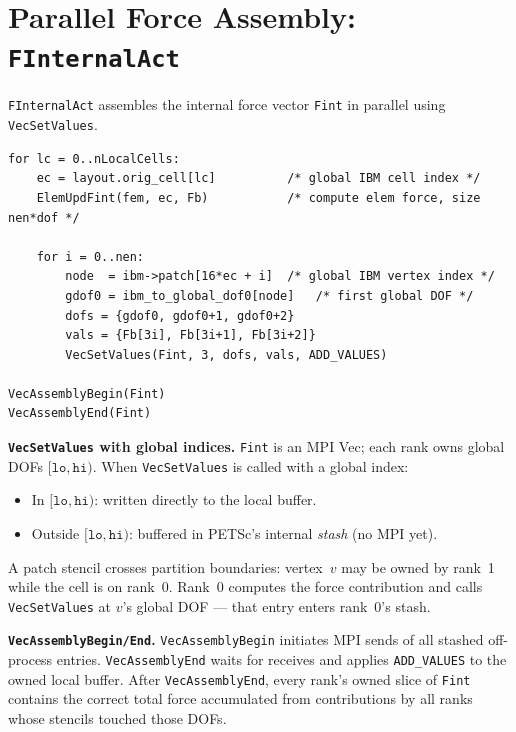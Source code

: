 \documentclass[11pt]{article}
\begin{document}
\section{Parallel Force Assembly: \texttt{FInternalAct}}

\texttt{FInternalAct} assembles the internal force vector \texttt{Fint} in parallel
using \texttt{VecSetValues}.

\begin{lstlisting}
for lc = 0..nLocalCells:
    ec = layout.orig_cell[lc]          /* global IBM cell index */
    ElemUpdFint(fem, ec, Fb)           /* compute elem force, size nen*dof */

    for i = 0..nen:
        node  = ibm->patch[16*ec + i]  /* global IBM vertex index */
        gdof0 = ibm_to_global_dof0[node]   /* first global DOF */
        dofs = {gdof0, gdof0+1, gdof0+2}
        vals = {Fb[3i], Fb[3i+1], Fb[3i+2]}
        VecSetValues(Fint, 3, dofs, vals, ADD_VALUES)

VecAssemblyBegin(Fint)
VecAssemblyEnd(Fint)
\end{lstlisting}

\textbf{\texttt{VecSetValues} with global indices.}
\texttt{Fint} is an MPI Vec; each rank owns global DOFs $[\texttt{lo}, \texttt{hi})$.
When \texttt{VecSetValues} is called with a global index:
\begin{itemize}
  \item In $[\texttt{lo}, \texttt{hi})$: written directly to the local buffer.
  \item Outside $[\texttt{lo}, \texttt{hi})$: buffered in PETSc's internal
        \emph{stash} (no MPI yet).
\end{itemize}

A patch stencil crosses partition boundaries: vertex~$v$ may be owned by rank~1
while the cell is on rank~0.  Rank~0 computes the force contribution and calls
\texttt{VecSetValues} at $v$'s global DOF --- that entry enters rank~0's stash.

\textbf{\texttt{VecAssemblyBegin/End}.}
\texttt{VecAssemblyBegin} initiates MPI sends of all stashed off-process entries.
\texttt{VecAssemblyEnd} waits for receives and applies \texttt{ADD\_VALUES} to the
owned local buffer.  After \texttt{VecAssemblyEnd}, every rank's owned slice of
\texttt{Fint} contains the correct total force accumulated from contributions
by all ranks whose stencils touched those DOFs.
\end{document}
